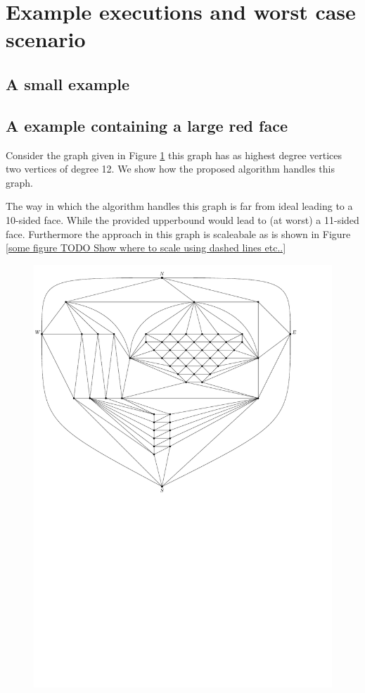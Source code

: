 
\section{Example executions and worst case scenario}
\thispagestyle{plain}

\subsection{A small example}


\subsection{A example containing a large red face}

Consider the graph given in Figure \ref{fig:ex:vert:graph} this graph has as highest degree vertices two vertices of degree 12. We show how the proposed algorithm handles this graph.

The way in which the algorithm handles this graph is far from ideal leading to a 10-sided face. While the provided upperbound would lead to (at worst) a 11-sided  face. Furthermore the approach in this graph is scaleabale as is shown in Figure \ref{some figure TODO Show where to scale using dashed lines etc..}

\begin{figure}[h]
  \centering
  \includegraphics[width=\textwidth]{examples/img/vertWorstCase/graph}
  \caption{}
  \label{fig:ex:vert:graph}
\end{figure}

